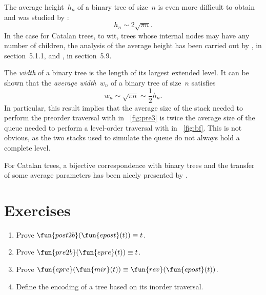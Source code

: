 
The average height~\(h_n\) of a
binary tree of size~\(n\) is even more difficult to obtain and was
studied by
\cite{FlajoletOdlyzko_1981,BrownShubert_1984,FlajoletOdlyzko_1984,Odlyzko_1984}:
\begin{equation*}
h_n \sim 2 \sqrt{\pi n}.
\end{equation*}
In the case for Catalan trees, to wit, trees whose internal nodes may
have any number of children, the analysis of the average height has
been carried out by \cite{DasarathyYang_1980,DershowitzZaks_1981},
\cite{Kemp_1984} in section~5.1.1,
\cite{DershowitzZaks_1990,KnuthdeBruijnRice_2000b} and
\cite{SedgewickFlajolet_1996}, in
section~5.9.


The \emph{width} of a binary tree is the
length of its largest extended level. It can be shown that the \emph{average
  width}~\(w_n\) of a binary tree of
size~\(n\) satisfies
\begin{equation*}
w_n \sim \sqrt{\pi n} \sim \frac{1}{2} h_n.
\end{equation*}
In particular, this result implies that the average size of the stack
needed to perform the preorder traversal with
 in
\fig~\vref{fig:pre3} is twice the average size of the queue needed to
perform a level\hyp{}order traversal with
 in \fig~\vref{fig:bf}. This is not
obvious, as the two stacks used to simulate the queue do not always
hold a complete level.

For Catalan trees, a bijective correspondence with binary trees and
the transfer of some average parameters has been nicely presented by
\cite{DasarathyYang_1980}.

\section*{Exercises}

\begin{enumerate}

  \item Prove \(\fun{post2b}(\fun{epost}(t)) \equiv t\).

  \item Prove \(\fun{pre2b}(\fun{epre}(t)) \equiv t\).

  \item Prove \(\fun{epre}(\fun{mir}(t)) \equiv
    \fun{rev}(\fun{epost}(t))\).

  \item Define the encoding of a tree based on its inorder traversal.

\end{enumerate}
